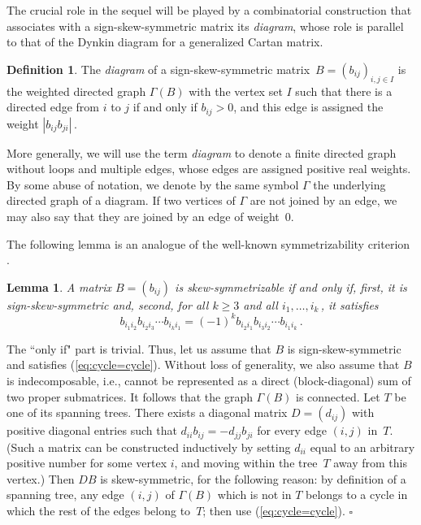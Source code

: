 \documentclass[letterpaper]{amsart}
\numberwithin{equation}{section}
\newtheorem{lemma}[theorem]{Lemma}
\theoremstyle{definition}
\newtheorem{definition}[theorem]{Definition}
\def\proof{\smallskip\noindent {\bf Proof.\ }}
\def\endproof{\hfill$\square$\medskip}
\begin{document}
The crucial role in the sequel will be played by a combinatorial 
construction that associates with a sign-skew-symmetric matrix 
its \emph{diagram}, whose role is parallel to that of the Dynkin 
diagram 
for a generalized Cartan matrix. 
 
\begin{definition} 
\label{def:diagram-of-B} 
The \emph{diagram} of a sign-skew-symmetric %
matrix~$B=(b_{ij})_{i,j\in I}$ is the weighted directed graph $\Gamma (B)$ 
with the vertex set $I$ such that there is a directed edge from $i$ to $j$ 
if and only if $b_{ij} > 0$, and this edge is assigned the weight 
$|b_{ij}b_{ji}|\,$. 
\end{definition} 
 
More generally, we will use the term \emph{diagram} to denote a finite 
directed graph without loops and multiple edges, whose edges are 
assigned positive real weights. 
By some abuse of notation, we denote by the same symbol $\Gamma$ 
the underlying directed graph of a diagram. 
If two vertices of $\Gamma$ are not joined by an edge, 
we may also say that they are joined by an edge of weight~$0$. 
 
 
The following lemma is an analogue of the well-known 
symmetrizability criterion \cite[Exercise~2.1]{kac}. 
 
\begin{lemma} 
A matrix $B = (b_{ij})$ is skew-symmetrizable if and only if, first, 
it is sign-skew-symmetric and, second, for all $k \geq 3$ and all 
$i_1, \dots, i_k\,$, it satisfies 
\begin{equation} 
\label{eq:cycle=cycle} 
b_{i_1 i_2} b_{i_2 i_3} \cdots b_{i_k i_1} = 
(-1)^k b_{i_2 i_1} b_{i_3 i_2} \cdots b_{i_1 i_k}\,. 
\end{equation} 
\end{lemma} 
 
 
\proof 
The ``only if" part 
is trivial. 
Thus, let us assume that $B$ is sign-skew-symmetric and satisfies 
(\ref{eq:cycle=cycle}). 
Without loss of generality, we also assume that $B$ is 
indecomposable, i.e., cannot be represented as a direct 
(block-diagonal) sum of two proper submatrices. 
It follows that the graph $\Gamma (B)$ is connected. 
Let $T$ be one of its spanning trees. 
There exists a diagonal matrix $D=(d_{ij})$ with positive diagonal entries such that 
$d_{ii} b_{ij}=-d_{jj} b_{ji}$ for every edge $(i,j)$ in~$T$. 
(Such a matrix can be constructed inductively by setting $d_{ii}$ 
equal to an arbitrary positive number for some vertex $i$, and moving 
within the tree~$T$ away from this vertex.) 
Then $DB$ is skew-symmetric, for the following reason: 
by definition of a spanning tree, any edge $(i,j)$ of $\Gamma (B)$ 
which is not in $T$  belongs to a cycle in which the rest of the edges belong to~$T$; then use 
(\ref{eq:cycle=cycle}). 
\endproof 
 
\end{document}
